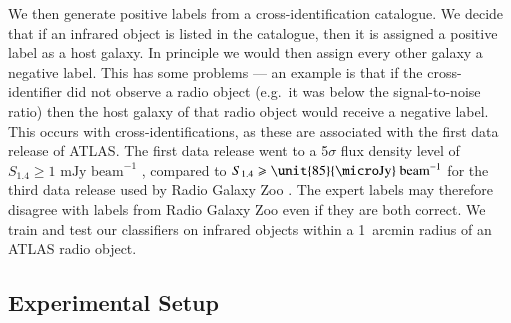 \documentclass[fleqn,usenatbib,usedcolumn]{mnras}
\newcommand{\jansky}{\text{Jy}}
\begin{document}
    We then generate positive labels from a cross-identification catalogue.
    We decide that if an infrared object is listed in the catalogue, then it
    is assigned a positive label as a host galaxy. In principle we would
    then assign every other galaxy a negative label. This has some problems
    --- an example is that if the cross-identifier did not observe a radio
    object (e.g.~it was below the signal-to-noise ratio) then the host galaxy of
    that radio object would receive a negative label. This occurs with
    \citet{norris06} cross-identifications, as these are associated with the
    first data release of ATLAS. The first data release went to a 5$\sigma$ flux
    density level of $S_{1.4} \geq 1 \text{ mJy beam}^{-1}$ \citep{norris06},
    compared to $S_{1.4} \geq \unit{85}{\micro\jansky}\text{ beam}^{-1}$ for the
    third data release used by Radio Galaxy Zoo \citep{franzen15}. The expert
    labels may therefore disagree with labels from Radio Galaxy Zoo even if they
    are both correct. We train and test our classifiers on infrared objects
    within a 1~arcmin radius of an ATLAS radio object.

  \subsection{Experimental Setup}
  \label{sec:experimental-setup}
\end{document}
